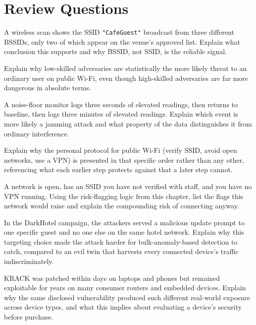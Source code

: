 \section*{Review Questions}
\begin{reviewquestions}
\item A wireless scan shows the SSID \texttt{"CafeGuest"} broadcast from three different BSSIDs,
only two of which appear on the venue's approved list. Explain what conclusion this supports and
why BSSID, not SSID, is the reliable signal.
\item Explain why low-skilled adversaries are statistically the more likely threat to an
ordinary user on public Wi-Fi, even though high-skilled adversaries are far more dangerous in
absolute terms.
\item A noise-floor monitor logs three seconds of elevated readings, then returns to baseline, then
logs three minutes of elevated readings. Explain which event is more likely a jamming attack and
what property of the data distinguishes it from ordinary interference.
\item Explain why the personal protocol for public Wi-Fi (verify SSID, avoid open networks, use a
VPN) is presented in that specific order rather than any other, referencing what each earlier
step protects against that a later step cannot.
\item A network is open, has an SSID you have not verified with staff, and you have no VPN
running. Using the risk-flagging logic from this chapter, list the flags this network would
raise and explain the compounding risk of connecting anyway.
\item In the DarkHotel campaign, the attackers served a malicious update prompt to one specific
guest and no one else on the same hotel network. Explain why this targeting choice made the
attack harder for bulk-anomaly-based detection to catch, compared to an evil twin that harvests
every connected device's traffic indiscriminately.
\item KRACK was patched within days on laptops and phones but remained exploitable for years on
many consumer routers and embedded devices. Explain why the same disclosed vulnerability produced
such different real-world exposure across device types, and what this implies about evaluating a
device's security before purchase.
\end{reviewquestions}

